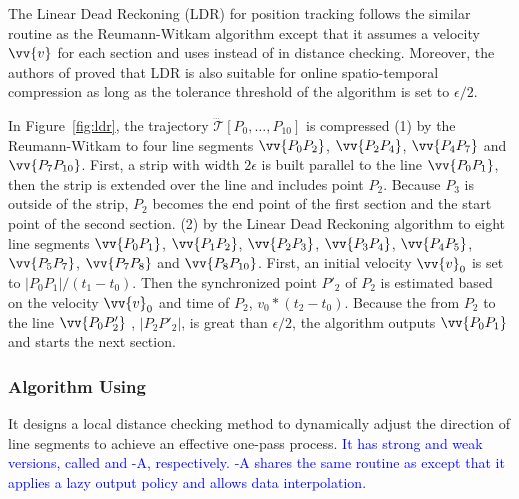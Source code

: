 {	{The Linear Dead Reckoning (LDR)\cite{Lange:Tracking} for position tracking follows the similar routine as the Reumann-Witkam algorithm except that it assumes a velocity ${\vv{v}}$ for each section and uses \sed instead of \ped in distance checking.
		Moreover, the authors of \cite{Trajcevski:DDR} proved that LDR is also suitable for online spatio-temporal compression as long as the tolerance threshold of the algorithm is set to $\epsilon/2$.}
	
	\begin{example}
		\label{exm-alg-strip}
		In Figure~\ref{fig:ldr}, the trajectory $\dddot{\mathcal{T}}[P_0, \ldots, P_{10}]$ is compressed
		(1) by the Reumann-Witkam to four line segments $\vv{P_0P_2}$, $\vv{P_2P_4}$, $\vv{P_4P_7}$ and $\vv{P_7P_{10}}$. First, a strip with width $2\epsilon$ is built parallel to the line $\vv{P_0P_1}$, then the strip is extended over the line and includes point $P_2$. Because $P_3$ is outside of the strip, $P_2$ becomes the end point of the first section and the start point of the second section.
		(2) by the Linear Dead Reckoning algorithm to eight line segments $\vv{P_0P_1}$, $\vv{P_1P_2}$, $\vv{P_2P_3}$, $\vv{P_3P_4}$, $\vv{P_4P_5}$, $\vv{P_5P_7}$, $\vv{P_7P_8}$ and $\vv{P_8P_{10}}$. First, an initial velocity ${\vv{v}_0}$ is set to $|P_0P_1|/(t_1-t_0)$. Then the synchronized point $P'_2$ of $P_2$ is estimated based on the velocity ${\vv{v}_0}$ and time of $P_2$, \ie ${v}_0 * (t_2-t_0)$. Because the \sed from $P_2$ to the line $\vv{P_0P'_2}$ , \ie $|P_2P'_2|$, is great than $\epsilon/2$, the algorithm outputs $\vv{P_0P_1}$ and starts the next section.
	\end{example}
	
}%


\subsubsection{{Algorithm \operb Using \ped} \cite{Lin:Operb}}
It designs a local distance checking method to dynamically adjust the direction of line segments to achieve an effective one-pass process. \textcolor{blue}{It has strong and weak versions, called \operb and \operb-A, respectively. \operb-A shares the same routine as \operb except that it applies a lazy output policy and allows data interpolation.}

